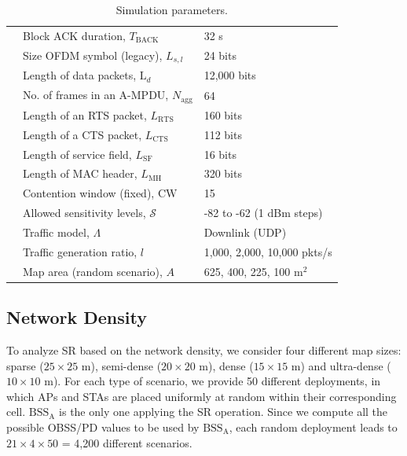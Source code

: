 \documentclass{ieeeaccess}
\begin{document}
\begin{table}[h]
{\begin{tabular}{c|l|l|}
			\cline{2-3} 
			\multicolumn{1}{|c|}{} & Block ACK duration, $T_\text{BACK}$ & 32 \textmu s \\
			\cline{2-3} 
			\multicolumn{1}{|c|}{} &  Size OFDM symbol (legacy), $L_{s,l}$ & 24 bits \\
			\cline{2-3} 
			\multicolumn{1}{|c|}{} & Length of data packets, $\text{L}_{d}$ & 12,000 bits \\
			\cline{2-3} 
			\multicolumn{1}{|c|}{} & No. of frames in an A-MPDU, $N_{\text{agg}}$ & 64 \\
			\cline{2-3} 
			\multicolumn{1}{|c|}{} & Length of an RTS packet, $L_\text{RTS}$ & 160 bits \\
			\cline{2-3} 
			\multicolumn{1}{|c|}{} & Length of a CTS packet, $L_\text{CTS}$ & 112 bits \\
			\cline{2-3} 
			\multicolumn{1}{|c|}{} & Length of service field, $L_\text{SF}$ & 16 bits  \\
			\cline{2-3} 
			\multicolumn{1}{|c|}{} & Length of MAC header, $L_\text{MH}$ & 320 bits \\
			\cline{2-3} 
			\multicolumn{1}{|c|}{} & Contention window (fixed), $\text{CW}$ & 15 \\
			\cline{2-3} 
			\multicolumn{1}{|c|}{} & Allowed sensitivity levels, $\mathcal{S}$ & -82 to -62 (1 dBm steps) \\
			\hline
			\multicolumn{1}{|c|}{\multirow{2}{*}{\centering\rotatebox[origin=c]{90}{Misc.  }}} & Traffic model, $\Lambda$ & Downlink (UDP)\\
			\cline{2-3} 
			\multicolumn{1}{|c|}{} & Traffic generation ratio, $l$ & 1,000, 2,000, 10,000 pkts/s\\ 
			\cline{2-3} 
			\multicolumn{1}{|c|}{} & Map area (random scenario), $A$ & 625, 400, 225, 100 m$^2$\\
			\hline
	\end{tabular}}
	\caption{Simulation parameters.}
	\label{table:parameters}
\end{table}

\subsection{Network Density}
\label{section:random_scenarios_density}
To analyze SR based on the network density, we consider four different map sizes: sparse ($25\times25$ m), semi-dense ($20\times20$ m), dense ($15\times15$ m) and ultra-dense ($10\times10$ m). For each type of scenario, we provide 50 different deployments, in which APs and STAs are placed uniformly at random within their corresponding cell. $\text{BSS}_\text{A}$ is the only one applying the SR operation. Since we compute all the possible OBSS/PD values to be used by $\text{BSS}_\text{A}$, each random deployment leads to $21\times4\times50$ = 4,200 different scenarios.
\end{document}

